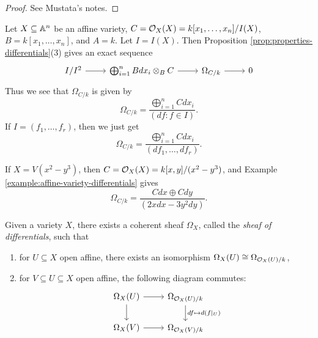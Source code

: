 \begin{proof}
  See Mustata's notes.
\end{proof}

\begin{example}\label{example:affine-variety-differentials}
  Let $X \subseteq \mathbb{A}^n$ be an affine
  variety, $C = \mathcal{O}_X(X) = k[x_1, \dots, x_n] / I(X)$,
  $B = k[x_1, \dots, x_n]$, and $A = k$.
  Let $I = I(X)$. Then
  Proposition \ref{prop:properties-differentials}(3) gives an exact sequence
  \[
    \begin{tikzcd}
      I / I^2 \ar[r]
      & \bigoplus_{i = 1}^n Bdx_i \otimes_B C \ar[r]
      & \Omega_{C / k} \ar[r] & 0
    \end{tikzcd}
  \]
  Thus we see that $\Omega_{C / k}$ is
  given by
  \[
    \Omega_{C / k}
    = \frac{\bigoplus_{i = 1}^n C dx_i}{(df : f \in I)}.
  \]
  If $I = (f_1, \dots, f_r)$, then we just get
  \[
    \Omega_{C / k}
    = \frac{\bigoplus_{i = 1}^n C dx_i}{(df_1, \dots, df_r)}.
  \]
\end{example}

\begin{example}
  If $X = V(x^2 - y^3)$, then
  $C = \mathcal{O}_X(X) = k[x, y] / (x^2 - y^3)$,
  and Example \ref{example:affine-variety-differentials} gives
  \[
    \Omega_{C / k}
    = \frac{Cdx \oplus C dy}{(2xdx - 3y^2 dy)}.
  \]
\end{example}

\begin{prop}
  Given a variety $X$, there exists a
  coherent sheaf $\Omega_X$,
  called the \emph{sheaf of differentials},
  such that
  \begin{enumerate}
    \item for $U \subseteq X$ open
      affine, there exists an isomorphism
      $\Omega_X(U) \cong \Omega_{\mathcal{O}_X(U) / k}$,
    \item for $V \subseteq U \subseteq X$
      open affine, the following diagram
      commutes:
      \[
        \begin{tikzcd}
          \Omega_X(U) \ar[r] \ar[d] & \Omega_{\OO_X(U) / k} \ar[d, "df \mapsto d(f|_U)"] \\
          \Omega_X(V) \ar[r] & \Omega_{\OO_X(V) / k}
        \end{tikzcd}
      \]
  \end{enumerate}
\end{prop}

